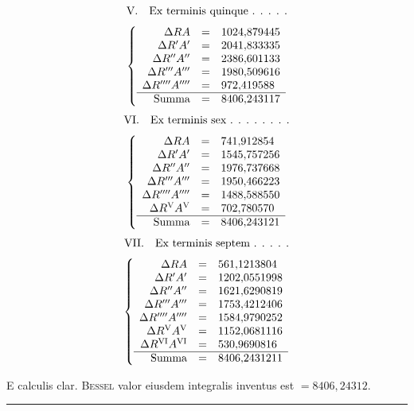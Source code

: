 \[
\begin{gathered}\mbox{V.\quad Ex terminis quinque . . . . .}\\[3pt]
\left\{\begin{array}{rcl}
\Delta RA&=&1024{,}879445\\
\Delta R'A'&=&2041{,}833335\\
\Delta R''A''&=&2386{,}601133\\
\Delta R'''A'''&=&1980{,}509616\\
\Delta R''''A''''&=&972{,}419588\\ \hline
\mbox{Summa}&=&8406{,}243117
\end{array}\right.\end{gathered}
\]
\[
\begin{gathered}\mbox{VI.\quad Ex terminis sex . . . . . . . .}\\[3pt]
\left\{\begin{array}{rcl}
\Delta RA&=&741{,}912854\\
\Delta R'A'&=&1545{,}757256\\
\Delta R''A''&=&1976{,}737668\\
\Delta R'''A'''&=&1950{,}466223\\
\Delta R''''A''''&=&1488{,}588550\\
\Delta R^{\mathrm{V}}A^{\mathrm{V}}&=&702{,}780570\\ \hline
\mbox{Summa}&=&8406{,}243121
\end{array}\right.\end{gathered}
\]
\[
\begin{gathered}\mbox{VII.\quad Ex terminis septem . . . . .}\\[3pt]
\left\{\begin{array}{rcl}
\Delta RA&=&561{,}1213804\\
\Delta R'A'&=&1202{,}0551998\\
\Delta R''A''&=&1621{,}6290819\\
\Delta R'''A'''&=&1753{,}4212406\\
\Delta R''''A''''&=&1584{,}9790252\\
\Delta R^{\mathrm{V}}A^{\mathrm{V}}&=&1152{,}0681116\\
\Delta R^{\mathrm{VI}}A^{\mathrm{VI}}&=&530{,}9690816\\ \hline
\mbox{Summa}&=&8406{,}2431211
\end{array}\right.\end{gathered}
\]

E calculis clar. \textsc{Bessel} valor eiusdem integralis inventus est $=8406{,}24312$.

\begin{center}\rule{0.24\linewidth}{0.3pt}\end{center}
